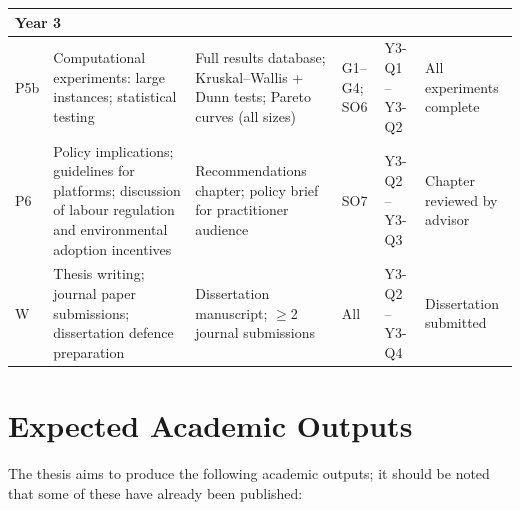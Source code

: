 \documentclass[12pt,a4paper]{report}
\begin{document}
\begin{table}[H]
\begin{tabularx}{1\linewidth}{p{0.4cm}p{3.5cm}p{3.8cm}p{2cm}p{2cm}p{2cm}}
\midrule
\multicolumn{6}{l}{\textbf{Year 3}} \\
\midrule
P5b & Computational experiments: large instances; statistical testing &
      Full results database; Kruskal--Wallis + Dunn tests; Pareto curves (all sizes) & G1--G4; SO6 & Y3-Q1 -- Y3-Q2 & All experiments complete \\
P6  & Policy implications; guidelines for platforms; discussion of labour regulation and environmental adoption incentives & Recommendations chapter; policy brief for practitioner audience &
      SO7 & Y3-Q2 -- Y3-Q3 & Chapter reviewed by advisor \\
W   & Thesis writing; journal paper submissions; dissertation defence preparation &
      Dissertation manuscript; $\geq$2 journal submissions &
      All & Y3-Q2 -- Y3-Q4 & Dissertation submitted \\
\bottomrule
\end{tabularx}
\end{table}


\section{Expected Academic Outputs}

The thesis aims to produce the following academic outputs; it should be noted that some of these have already been published:
\end{document}
